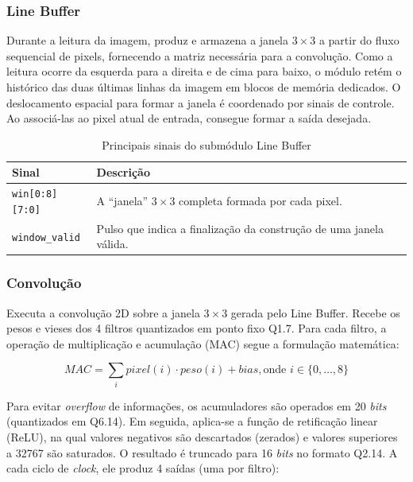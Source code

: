 \subsubsection{Line Buffer}
Durante a leitura da imagem, produz e armazena a janela $3 \times 3$ a partir do fluxo sequencial de pixels, fornecendo a matriz necessária para a convolução. Como a leitura ocorre da esquerda para a direita e de cima para baixo, o módulo retém o histórico das duas últimas linhas da imagem em blocos de memória dedicados. O deslocamento espacial para formar a janela é coordenado por sinais de controle. Ao associá-las ao pixel atual de entrada, consegue formar a saída desejada.

\begin{table}[htbp]
\centering
\caption{Principais sinais do submódulo Line Buffer}
\label{tab:sinais_linebuffer}
\small
\begin{tabularx}{\textwidth}{l X}
\toprule
\textbf{Sinal} & \textbf{Descrição} \\
\midrule
\texttt{win[0:8][7:0]} & A ``janela'' $3 \times 3$ completa formada por cada pixel. \\
\texttt{window\_valid} & Pulso que indica a finalização da construção de uma janela válida. \\
\bottomrule
\end{tabularx}
\end{table}

\subsubsection{Convolução}
Executa a convolução 2D sobre a janela $3 \times 3$ gerada pelo Line Buffer. Recebe os pesos e vieses dos 4 filtros quantizados em ponto fixo Q1.7. Para cada filtro, a operação de multiplicação e acumulação (MAC) segue a formulação matemática:

$$ MAC = \sum_{i} pixel(i) \cdot peso(i) + bias, \text{onde } i \in \{0, \dots, 8\} $$

Para evitar \textit{overflow} de informações, os acumuladores são operados em 20 \textit{bits} (quantizados em Q6.14). Em seguida, aplica-se a função de retificação linear (ReLU), na qual valores negativos são descartados (zerados) e valores superiores a 32767 são saturados. O resultado é truncado para 16 \textit{bits} no formato Q2.14. A cada ciclo de \textit{clock}, ele produz 4 saídas (uma por filtro):


